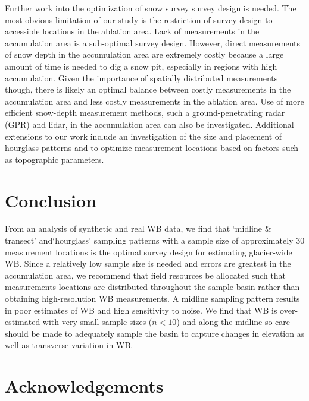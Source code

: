 \documentclass{article}
\begin{document}
Further work into the optimization of snow survey survey design is needed. The most obvious limitation of our study is the restriction of survey design to accessible locations in the ablation area. Lack of measurements in the accumulation area is a sub-optimal survey design. However, direct measurements of snow depth in the accumulation area are extremely costly because a large amount of time is needed to dig a snow pit, especially in regions with high accumulation. Given the importance of spatially distributed measurements though, there is likely an optimal balance between costly measurements in the accumulation area and less costly measurements in the ablation area. Use of more efficient snow-depth measurement methods, such a ground-penetrating radar (GPR) and lidar, in the accumulation area can also be investigated. Additional extensions to our work include an investigation of the size and placement of hourglass patterns and to optimize measurement locations based on factors such as topographic parameters. 


\section{Conclusion}

From an analysis of synthetic and real WB data, we find that `midline \& transect' and`hourglass' sampling patterns with a sample size of approximately 30 measurement locations is the optimal survey design for estimating glacier-wide WB. Since a relatively low sample size is needed and errors are greatest in the accumulation area, we recommend that field resources be allocated such that measurements locations are distributed throughout the sample basin rather than obtaining high-resolution WB measurements. A midline sampling pattern results in poor estimates of WB and high sensitivity to noise. We find that WB is over-estimated with very small sample sizes ($n<10$) and along the midline so care should be made to adequately sample the basin to capture changes in elevation as well as transverse variation in WB. 




\section{Acknowledgements}
\end{document}
